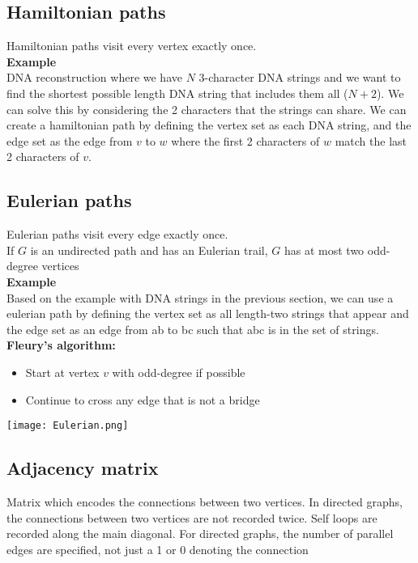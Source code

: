 \documentclass{article}
\begin{document}
\begin{spacing}{1.5}
\subsection{Hamiltonian paths}
\label{sec:hamilton}
Hamiltonian paths visit every vertex exactly once.\\
\textbf{Example}\\
DNA reconstruction where we have $N$ 3-character DNA strings and we want to find the shortest possible length  DNA string that includes them all ($N+2$). We can solve this by considering the 2 characters that the strings can share. We can create a hamiltonian path by defining the vertex set as each DNA string, and the edge set as the edge from $v$ to $w$ where the first 2 characters of $w$ match the last 2 characters of $v$.  
\newpage
\subsection{Eulerian paths}
\label{sec:eulerian}
Eulerian paths visit every edge exactly once.\\
If $G$ is an undirected path and has an Eulerian trail, $G$ has at most two odd-degree vertices\\
\textbf{Example}\\
Based on the example with DNA strings in the previous section, we can use a eulerian path by defining the vertex set as all length-two strings that appear and the edge set as an edge from ab to bc such that abc is in the set of strings.\\
\textbf{Fleury's algorithm:}
\begin{spacing}{1}
    \begin{itemize}
        \item Start at vertex $v$ with odd-degree if possible
        \item Continue to cross any edge that is not a bridge
    \end{itemize}
\end{spacing}
\begin{center}
   \texttt{[image: Eulerian.png]} 
\end{center}
\subsection{Adjacency matrix}
Matrix which encodes the connections between two vertices. In directed graphs, the connections between two vertices are not recorded twice. Self loops are recorded along the main diagonal. For directed graphs, the number of parallel edges are specified, not just a 1 or 0 denoting the connection
\newpage

\end{spacing}
\end{document}
